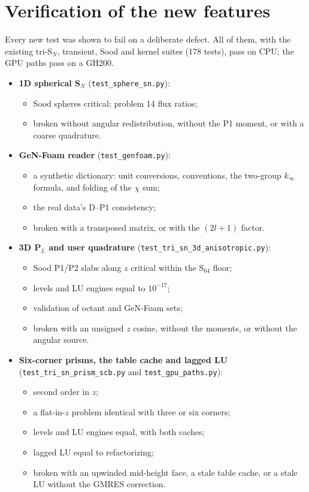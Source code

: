 \documentclass[a4paper,10pt]{article}
\newcommand{\genfoam}{GeN-Foam}
\newcommand{\code}[1]{\texttt{#1}}
\begin{document}
\section{Verification of the new features}

Every new test was shown to fail on a deliberate defect. All of them, with the
existing tri-S$_N$, transient, Sood and kernel suites (178 tests), pass on CPU;
the GPU paths pass on a GH200.

\begin{itemize}
\item \textbf{1D spherical S$_N$} (\code{test\_sphere\_sn.py}):
  \begin{itemize}
  \item Sood spheres critical; problem 14 flux ratios;
  \item broken without angular redistribution, without the P1 moment, or with
    a coarse quadrature.
  \end{itemize}
\item \textbf{\genfoam{} reader} (\code{test\_genfoam.py}):
  \begin{itemize}
  \item a synthetic dictionary: unit conversions, conventions, the two-group
    $k_\infty$ formula, and folding of the $\chi$ sum;
  \item the real data's D--P1 consistency;
  \item broken with a transposed matrix, or with the $(2l+1)$ factor.
  \end{itemize}
\item \textbf{3D P$_L$ and user quadrature}
  (\code{test\_tri\_sn\_3d\_anisotropic.py}):
  \begin{itemize}
  \item Sood P1/P2 slabs along $z$ critical within the S$_{64}$ floor;
  \item levels and LU engines equal to $10^{-17}$;
  \item validation of octant and \genfoam{} sets;
  \item broken with an unsigned $z$ cosine, without the moments, or without the
    angular source.
  \end{itemize}
\item \textbf{Six-corner prisms, the table cache and lagged LU}
  (\code{test\_tri\_sn\_prism\_scb.py} and
  \code{test\_gpu\_paths.py}):
  \begin{itemize}
  \item second order in $z$;
  \item a flat-in-$z$ problem identical with three or six corners;
  \item levels and LU engines equal, with both caches;
  \item lagged LU equal to refactorizing;
  \item broken with an upwinded mid-height face, a stale table cache, or a
    stale LU without the GMRES correction.
  \end{itemize}
\end{itemize}
\end{document}
